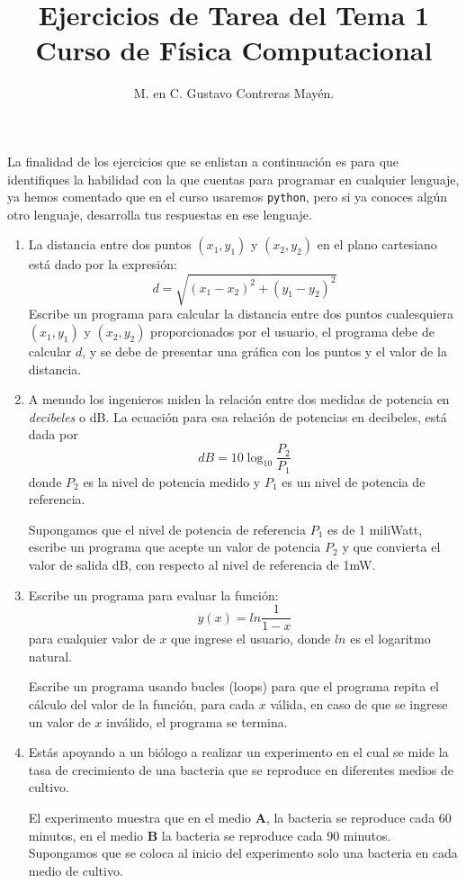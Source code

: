 \documentclass[12pt]{article}
\author{M. en C. Gustavo Contreras Mayén.}
\title{Ejercicios de Tarea del Tema 1 \\ Curso de Física Computacional}
\date{ }
\newcommand{\python}{\texttt{python}}
\begin{document}
\maketitle
\fontsize{14}{14}\selectfont
La finalidad de los ejercicios que se enlistan a continuación es para que identifiques la habilidad con la que cuentas para programar en cualquier lenguaje, ya hemos comentado que en el curso usaremos \python, pero si ya conoces algún otro lenguaje, desarrolla tus respuestas en ese lenguaje.
\begin{enumerate}
\item La distancia entre dos puntos $(x_{1},y_{1})$ y $(x_{2},y_{2})$ en el plano cartesiano está dado por la expresión:
\[ d = \sqrt{(x_{1} - x_{2})^{2} + (y_{1} - y_{2})^{2}} \]
Escribe un programa para calcular la distancia entre dos puntos cualesquiera $(x_{1}, y_{1})$ y $(x_{2}, y_{2})$ proporcionados por el usuario, el programa debe de calcular $d$, y se debe de presentar una gráfica con los puntos y el valor de la distancia.
\item A menudo los ingenieros miden la relación entre dos medidas de potencia en \textit{decibeles} o dB. La ecuación para esa relación de potencias en decibeles, está dada por
\[ dB = 10 \log_{10} \dfrac{P_{2}}{P_{1}} \]
donde $P_{2}$ es la nivel de potencia medido y $P_{1}$ es un nivel de potencia de referencia.
\par
Supongamos que el nivel de potencia de referencia $P_{1}$ es de 1 miliWatt, escribe un programa que acepte un valor de potencia $P_{2}$ y que convierta el valor de salida dB, con respecto al nivel de referencia de 1mW.
\item Escribe un programa para evaluar la función:
\[ y(x) = ln \dfrac{1}{1-x} \]
para cualquier valor de $x$ que ingrese el usuario, donde $ln$ es el logaritmo natural.
\par
Escribe un programa usando bucles (loops) para que el programa repita el cálculo del valor de la función, para cada $x$ válida, en caso de que se ingrese un valor de $x$ inválido, el programa se termina.
\item Estás apoyando a un biólogo a realizar un experimento en el cual se mide la tasa de crecimiento de una bacteria que se reproduce en diferentes medios de cultivo.
\par
El experimento muestra que en el medio \textbf{A}, la bacteria se reproduce cada $60$ minutos, en el medio \textbf{B} la bacteria se reproduce cada $90$ minutos. Supongamos que se coloca al inicio del experimento solo una bacteria en cada medio de cultivo.

\end{enumerate}
\end{document}
